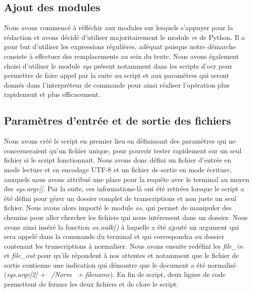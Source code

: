 \subsection{Ajout des modules}
Nous avons commencé à réfléchir aux modules sur lesquels s'appuyer pour la rédaction et avons décidé d'utiliser majoritairement le module \emph{re} de Python. Il a pour but d'utiliser les expressions régulières, adéquat puisque notre démarche consiste à effectuer des remplacements au sein du texte. Nous avons également choisi d'utiliser le module \emph{sys} présent notamment dans les scripts d'\acrshort{ocr} pour permettre de faire appel par la suite au script et aux paramètres qui seront donnés dans l'interpréteur de commande pour ainsi réaliser l'opération plus rapidement et plus efficacement. 

\subsection{Paramètres d'entrée et de sortie des fichiers}
Nous avons créé le script en premier lieu en définissant des paramètres qui ne concerneraient qu'un fichier unique, pour pouvoir tester rapidement sur un seul fichier si le script fonctionnait. Nous avons donc défini un fichier d'entrée en mode lecture et en encodage UTF-8 et un fichier de sortie en mode écriture, auxquels nous avons attribué une place pour la requête avec le terminal au moyen des \emph{sys.argv[]}. Par la suite, ces informations-là ont été retirées lorsque le script a été défini pour gérer un dossier complet de transcriptions et non juste un seul fichier. Nous avons alors importé le module \emph{os}, qui permet de manipuler des chemins pour aller chercher les fichiers qui nous intéressent dans un dossier. Nous avons ainsi inséré la fonction \emph{os.walk()} à laquelle a été ajouté un argument qui sera appelé dans la commande du terminal et qui correspondra au dossier contenant les transcriptions à normaliser. Nous avons ensuite redéfini les \emph{file\_in} et \emph{file\_out} pour qu'ils répondent à nos attentes et notamment que le fichier de sortie contienne une indication qui démontre que le document a été normalisé (\emph{sys.argv[2] + \og~/Norm~\fg{} + filename}). En fin de script, deux lignes de code permettent de fermer les deux fichiers et de clore le script.

